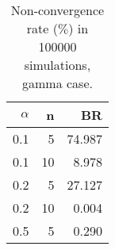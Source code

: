 \begin{table}

\caption{\label{tab:esgammaconv}Non-convergence rate ($\%$) in 100000 simulations, gamma case.}
\centering
\begin{tabular}[t]{rrr}
\toprule
$\alpha$ & n & BR\\
\midrule
0.1 & 5 & 74.987\\
0.1 & 10 & 8.978\\
0.2 & 5 & 27.127\\
0.2 & 10 & 0.004\\
0.5 & 5 & 0.290\\
\bottomrule
\end{tabular}
\end{table}
